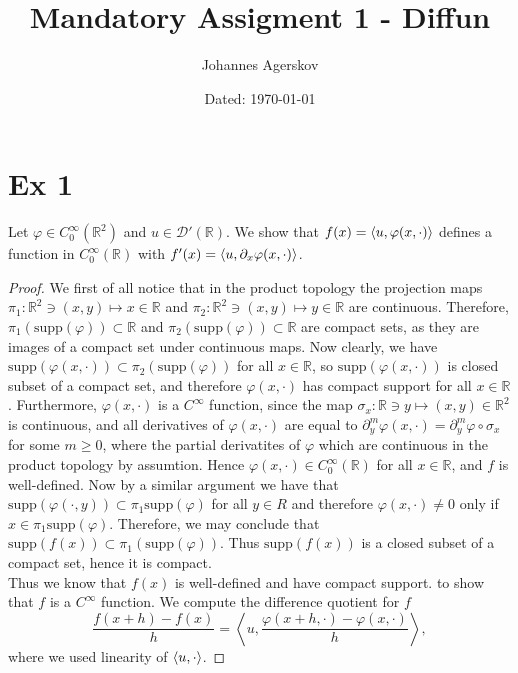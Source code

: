 \documentclass[a4paper,11pt]{article}
\author{Johannes Agerskov}
\date{Dated: \today}
\title{Mandatory Assigment 1 - Diffun}
\newcommand{\supp}{\text{supp}}
\newcommand{\R}{\mathbb{R}}
\numberwithin{equation}{section}
\begin{document}
\maketitle	
\section*{Ex 1}
\setcounter{section}{1}
Let $ \varphi\in C^\infty_0(\R^2) $ and $ u\in\mathcal{D}'(\R) $. We show that $ f(x)=\braket{u,\varphi(x,\cdot)} $ defines a function in $ C^\infty_0(\R) $ with $ f'(x)=\braket{u,\partial_x\varphi(x,\cdot)} $.
\begin{proof}
	We first of all notice that in the product topology the projection maps $ \pi_1: \R^2\ni(x,y)\mapsto x\in \R $ and $ \pi_2: \R^2\ni(x,y)\mapsto y\in \R $ are continuous. Therefore, $ \pi_1(\supp(\varphi))\subset \R $ and $ \pi_2(\supp(\varphi))\subset \R $ are compact sets, as they are images of a compact set under continuous maps.	
	 Now clearly, we have $ \supp(\varphi(x,\cdot))\subset \pi_2(\supp(\varphi)) $ for all $ x\in \R $, so $ \supp(\varphi(x,\cdot)) $ is closed subset of a compact set, and therefore $ \varphi(x,\cdot) $ has compact support for all $ x\in \R $. Furthermore, $ \varphi(x,\cdot) $ is a $ C^\infty $ function, since the map $ \sigma_x:\R\ni y\mapsto(x,y)\in\R^2 $ is continuous, and all derivatives of $ \varphi(x,\cdot) $ are equal to $ \partial_y^m\varphi(x,\cdot)=\partial_y^m\varphi\circ \sigma_x $ for some $ m\geq0 $, where the partial derivatites of $ \varphi $ which are continuous in the product topology by assumtion. Hence $ \varphi(x,\cdot)\in C^{\infty}_0(\R) $ for all $ x\in \R $, and $ f $ is well-defined. Now by a similar argument we have that $ \supp(\varphi(\cdot,y))\subset\pi_1\supp(\varphi) $ for all $ y\in R $ and therefore $ \varphi(x,\cdot)\neq0 $ only if $ x\in\pi_1\supp(\varphi) $. Therefore, we may conclude that $ \supp(f(x))\subset \pi_1(\supp(\varphi)) $. Thus $ \supp(f(x)) $ is a closed subset of a compact set, hence it is compact.\\
	 Thus we know that $ f(x) $ is well-defined and have compact support. to show that $ f $ is a $ C^\infty $ function. We compute the difference quotient for $ f $\begin{equation}\label{diff.quotient}
	 \frac{f(x+h)-f(x)}{h}=\left\langle u, \frac{\varphi(x+h,\cdot)-\varphi(x,\cdot)}{h}\right\rangle,
	 \end{equation}
	 where we used linearity of $ \braket{u,\cdot} $.

\end{proof}
\end{document}
